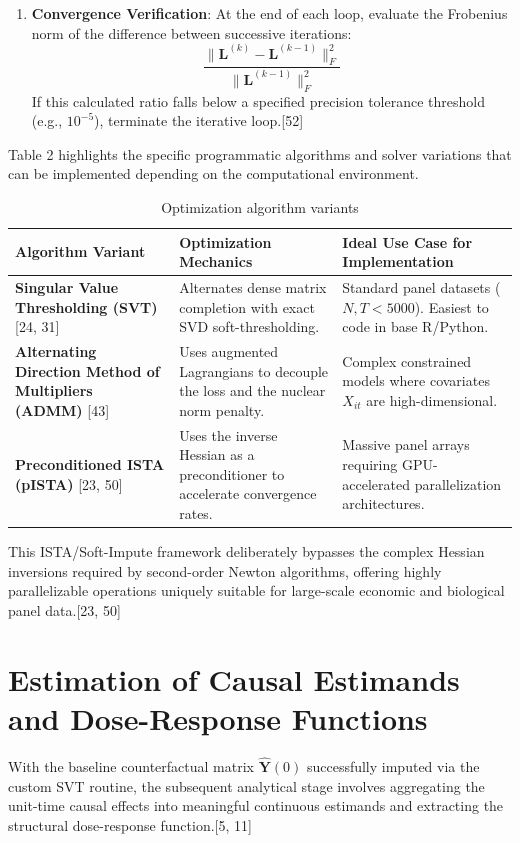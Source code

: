 \documentclass{article}
\begin{document}
\begin{enumerate}
    \item \textbf{Convergence Verification}: At the end of each loop, evaluate the Frobenius norm of the difference between successive iterations: 
    $$\frac{\|\mathbf{L}^{(k)} - \mathbf{L}^{(k-1)}\|_F^2}{\|\mathbf{L}^{(k-1)}\|_F^2}$$
    If this calculated ratio falls below a specified precision tolerance threshold (e.g., $10^{-5}$), terminate the iterative loop.[52]
\end{enumerate}

Table 2 highlights the specific programmatic algorithms and solver variations that can be implemented depending on the computational environment.

\begin{table}[h]
\centering
\begin{tabular}{p{} p{} p{}}
\toprule
\textbf{Algorithm Variant} & \textbf{Optimization Mechanics} & \textbf{Ideal Use Case for Implementation} \\
\midrule
\textbf{Singular Value Thresholding (SVT)} [24, 31] & Alternates dense matrix completion with exact SVD soft-thresholding. & Standard panel datasets ($N, T < 5000$). Easiest to code in base R/Python. \\
\textbf{Alternating Direction Method of Multipliers (ADMM)} [43] & Uses augmented Lagrangians to decouple the loss and the nuclear norm penalty. & Complex constrained models where covariates $X_{it}$ are high-dimensional. \\
\textbf{Preconditioned ISTA (pISTA)} [23, 50] & Uses the inverse Hessian as a preconditioner to accelerate convergence rates. & Massive panel arrays requiring GPU-accelerated parallelization architectures. \\
\bottomrule
\end{tabular}
\caption{Optimization algorithm variants}
\end{table}

This ISTA/Soft-Impute framework deliberately bypasses the complex Hessian inversions required by second-order Newton algorithms, offering highly parallelizable operations uniquely suitable for large-scale economic and biological panel data.[23, 50] 

\section{Estimation of Causal Estimands and Dose-Response Functions}

With the baseline counterfactual matrix $\hat{\mathbf{Y}}(0)$ successfully imputed via the custom SVT routine, the subsequent analytical stage involves aggregating the unit-time causal effects into meaningful continuous estimands and extracting the structural dose-response function.[5, 11]
\end{document}
